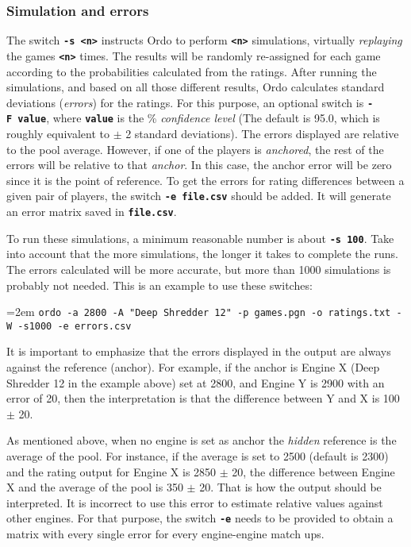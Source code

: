 \documentclass[12pt]{article}
\newcommand{\swtch} [1] {\texttt{\textbf{#1}}}
\newcommand{\cmdln}[1]{
	\par
	\begingroup
		\leftskip=2em
		\addtolength{\rightskip}{0em}
		\noindent \small{\texttt{#1}}
		\par
	\endgroup
}
\begin{document}
\subsubsection*{Simulation and errors}

The switch \swtch{-s~<n>} instructs Ordo to perform \swtch{<n>} simulations, virtually \textit{replaying} the games \swtch{<n>} times.
The results will be randomly re-assigned for each game according to the probabilities calculated from the ratings. 
After running the simulations, and based on all those different results, Ordo calculates standard deviations (\textit{errors}) for the ratings.
For this purpose, an optional switch is \swtch{-F~value}, where \swtch{value} is the \% \textit{confidence level} (The default is 95.0, which is roughly equivalent to $\pm$ 2 standard deviations).
The errors displayed are relative to the pool average. 
However, if one of the players is \textit{anchored}, the rest of the errors will be relative to that \textit{anchor}.
In this case, the anchor error will be zero since it is the point of reference.
To get the errors for rating differences between a given pair of players, the switch \swtch{-e~file.csv} should be added.
It will generate an error matrix saved in \swtch{file.csv}.

To run these simulations, a minimum reasonable number is about \swtch{-s~100}. 
Take into account that the more simulations, the longer it takes to complete the runs. 
The errors calculated will be more accurate, but more than 1000 simulations is probably not needed. 
This is an example to use these switches:

\cmdln{ordo -a 2800 -A "Deep Shredder 12" -p games.pgn -o ratings.txt -W -s1000 -e errors.csv}

It is important to emphasize that the errors displayed in the output are always against the reference (anchor). 
For example, if the anchor is Engine X (Deep Shredder 12 in the example above) set at 2800, and Engine Y is 2900 with an error of 20, then the interpretation is that the difference between Y and X is 100 $\pm$ 20. 

As mentioned above, when no engine is set as anchor the \textit{hidden} reference is the average of the pool. 
For instance, if the average is set to 2500 (default is 2300) and the rating output for Engine X is 2850 $\pm$ 20, the difference between Engine X and the average of the pool is 350 $\pm$ 20. 
That is how the output should be interpreted. 
It is incorrect to use this error to estimate relative values against other engines. 
For that purpose, the switch \swtch{-e} needs to be provided to obtain a matrix with every single error for every engine-engine match ups.
\end{document}
